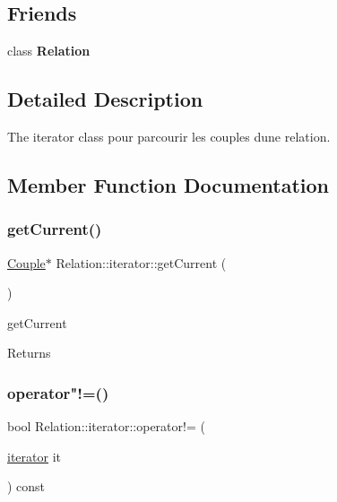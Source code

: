 \subsection*{Friends}
\begin{DoxyCompactItemize}
\item 
\mbox{\label{class_relation_1_1iterator_a7ee004262f27f8c916688911a71e3aa1}} 
class {\bfseries Relation}
\end{DoxyCompactItemize}


\subsection{Detailed Description}
The iterator class pour parcourir les couples d\textquotesingle{}une relation. 

\subsection{Member Function Documentation}
\mbox{\label{class_relation_1_1iterator_a728be28e8dde170eb5b1118c1bbf40e8}} 
\subsubsection{\texorpdfstring{get\+Current()}{getCurrent()}}
{\footnotesize\ttfamily \hyperlink{class_couple}{Couple}$\ast$ Relation\+::iterator\+::get\+Current (\begin{DoxyParamCaption}{ }\end{DoxyParamCaption})\hspace{0.3cm}{\ttfamily [inline]}}



get\+Current 

\begin{DoxyReturn}{Returns}

\end{DoxyReturn}
\mbox{\label{class_relation_1_1iterator_aafc9388a869b414adc2169e2e3beffc0}} 
\subsubsection{\texorpdfstring{operator"!=()}{operator!=()}}
{\footnotesize\ttfamily bool Relation\+::iterator\+::operator!= (\begin{DoxyParamCaption}\item[{\hyperlink{class_relation_1_1iterator}{iterator}}]{it }\end{DoxyParamCaption}) const\hspace{0.3cm}{\ttfamily [inline]}}



